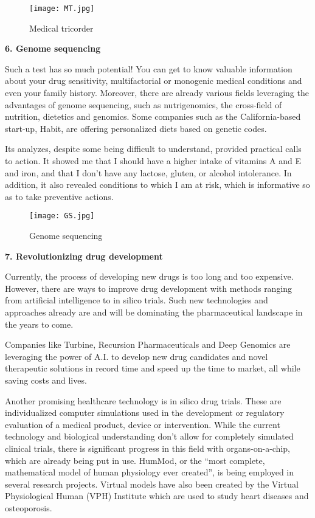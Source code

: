 \documentclass[12pt,a4paper]{article}
\begin{document}
\begin{figure}[h]
\centering
\texttt{[image: MT.jpg]}
\caption{Medical tricorder}
\end{figure}

\clearpage

\textbf{6. Genome sequencing}

\hspace{1cm}


Such a test has so much potential! You can get to know valuable information about your drug sensitivity, multifactorial or monogenic medical conditions and even your family history. Moreover, there are already various fields leveraging the advantages of genome sequencing, such as nutrigenomics, the cross-field of nutrition, dietetics and genomics. Some companies such as the California-based start-up, Habit, are offering personalized diets based on genetic codes. 


Its analyzes, despite some being difficult to understand, provided practical calls to action. It showed me that I should have a higher intake of vitamins A and E and iron, and that I don’t have any lactose, gluten, or alcohol intolerance. In addition, it also revealed conditions to which I am at risk, which is informative so as to take preventive actions.


\begin{figure}[h]
\centering
\texttt{[image: GS.jpg]}
\caption{Genome sequencing}
\end{figure}






\textbf{7. Revolutionizing drug development}

\hspace{1cm}

Currently, the process of developing new drugs is too long and too expensive. However, there are ways to improve drug development with methods ranging from artificial intelligence to in silico trials. Such new technologies and approaches already are and will be dominating the pharmaceutical landscape in the years to come.

Companies like Turbine, Recursion Pharmaceuticals and Deep Genomics are leveraging the power of A.I. to develop new drug candidates and novel therapeutic solutions in record time and speed up the time to market, all while saving costs and lives.


Another promising healthcare technology is in silico drug trials. These are individualized computer simulations used in the development or regulatory evaluation of a medical product, device or intervention. While the current technology and biological understanding don’t allow for completely simulated clinical trials, there is significant progress in this field with organs-on-a-chip, which are already being put in use. HumMod, or the “most complete, mathematical model of human physiology ever created”, is being employed in several research projects. Virtual models have also been created by the Virtual Physiological Human (VPH) Institute which are used to study heart diseases and osteoporosis.
\end{document}
